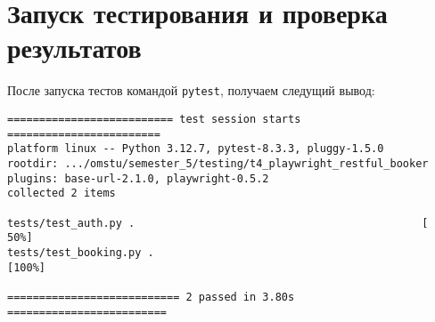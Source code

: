 \section{Запуск тестирования и проверка результатов}

После запуска тестов командой \texttt{pytest}, получаем следущий вывод:

\begin{verbatim}
========================== test session starts ========================
platform linux -- Python 3.12.7, pytest-8.3.3, pluggy-1.5.0
rootdir: .../omstu/semester_5/testing/t4_playwright_restful_booker
plugins: base-url-2.1.0, playwright-0.5.2
collected 2 items                                        

tests/test_auth.py .                                             [ 50%]
tests/test_booking.py .                                          [100%]

=========================== 2 passed in 3.80s =========================
\end{verbatim}
